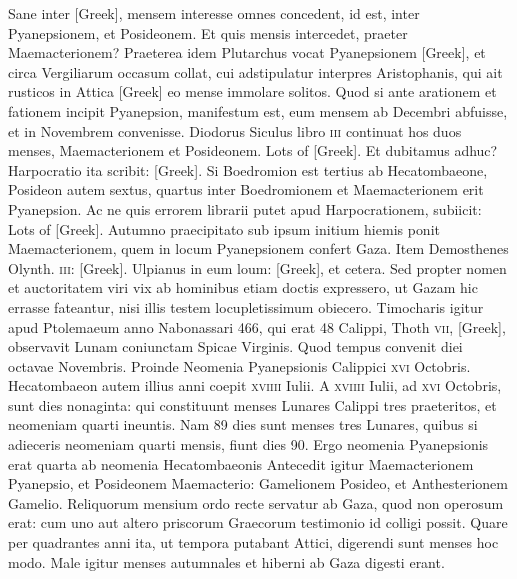 Sane inter \textgreek{[Greek]},
 mensem interesse omnes concedent,
id est, inter Pyanepsionem, et Posideonem.
Et quis mensis intercedet,
praeter Maemacterionem?
Praeterea idem Plutarchus vocat
Pyanepsionem \textgreek{[Greek]}, et circa Vergiliarum occasum collat,
cui adstipulatur interpres Aristophanis, qui ait rusticos in Attica
 \textgreek{[Greek]}
eo mense immolare solitos.
Quod si ante arationem
et fationem incipit Pyanepsion, manifestum est, eum mensem ab Decembri
abfuisse, et in Novembrem convenisse.
Diodorus Siculus libro
\textsc{iii} continuat hos duos menses, Maemacterionem et Posideonem.
\textgreek{Lots of [Greek]}.
Et dubitamus adhuc?
Harpocratio ita scribit: \textgreek{[Greek]}.
Si Boedromion est tertius ab Hecatombaeone,
Posideon autem sextus, quartus inter Boedromionem
et Maemacterionem erit Pyanepsion.
Ac ne quis errorem librarii
putet apud Harpocrationem, subiicit: \textgreek{Lots of [Greek]}.
Autumno praecipitato sub
ipsum initium hiemis ponit Maemacterionem, quem in locum Pyanepsionem
confert Gaza.
Item Demosthenes Olynth. \textsc{iii}: \textgreek{[Greek]}.
Ulpianus in eum loum: \textgreek{[Greek]},
et cetera.
Sed propter nomen et auctoritatem viri vix ab hominibus
etiam doctis expressero, ut Gazam hic errasse fateantur, nisi
illis testem locupletissimum obiecero.
Timocharis igitur apud Ptolemaeum
anno Nabonassari 466, qui erat 48 Calippi, Thoth \textsc{vii},
\textgreek{[Greek]}, observavit Lunam coniunctam Spicae Virginis.
Quod tempus convenit diei octavae Novembris.
Proinde Neomenia
Pyanepsionis Calippici \textsc{xvi} Octobris.
Hecatombaeon autem
illius anni coepit \textsc{xviiii} Iulii.
A \textsc{xviiii} Iulii, ad \textsc{xvi} Octobris, sunt
dies nonaginta: qui constituunt menses Lunares Calippi tres praeteritos,
et neomeniam quarti ineuntis.
Nam 89 dies sunt menses tres
Lunares, quibus si adieceris neomeniam quarti mensis, fiunt dies 90.
Ergo neomenia Pyanepsionis erat quarta ab neomenia Hecatombaeonis
Antecedit igitur Maemacterionem Pyanepsio, et Posideonem
Maemacterio: Gamelionem Posideo, et Anthesterionem Gamelio.
Reliquorum mensium ordo recte servatur ab Gaza, quod non operosum
erat: cum uno aut altero priscorum Graecorum testimonio
id colligi possit.
Quare per quadrantes anni ita, ut tempora putabant
Attici, digerendi sunt menses hoc modo.
Male igitur menses
autumnales et hiberni ab Gaza digesti erant.

